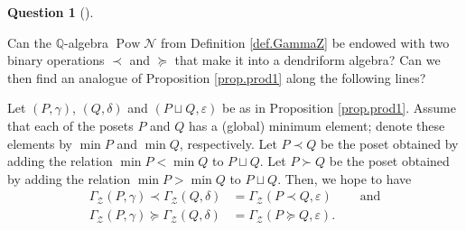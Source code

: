 \documentclass[numbers=enddot,12pt,final,onecolumn,notitlepage]{scrartcl}%
\theoremstyle{definition}
\newtheorem{quest}[theo]{Question}
\newenvironment{question}[1][]
{\begin{quest}[#1]\begin{leftbar}}
{\end{leftbar}\end{quest}}
\newenvironment{question}[1][Question]{\noindent\textbf{#1.} }{\ \rule{0.5em}{0.5em}}
\newenvironment{vershort}{}{}
\begin{document}
\begin{vershort}
\begin{question}
Can the $\mathbb{Q}$-algebra $\operatorname*{Pow}\mathcal{N}$ from Definition
\ref{def.GammaZ} be endowed with two binary operations $\left.  \prec\right.
$ and $\left.  \succeq\right.  $ that make it into a dendriform algebra? Can
we then find an analogue of Proposition \ref{prop.prod1} along the following lines?

Let $\left(  P,\gamma\right)  $, $\left(  Q,\delta\right)  $ and $\left(
P\sqcup Q,\varepsilon\right)  $ be as in Proposition \ref{prop.prod1}. Assume
that each of the posets $P$ and $Q$ has a (global) minimum element; denote these
elements by $\min P$ and $\min Q$, respectively.
Let $P \left. \prec \right. Q$ be the poset obtained by adding
the relation $\min P<\min Q$ to $P\sqcup Q$.
Let $P \left. \succ \right. Q$ be the poset obtained by adding
the relation $\min P>\min Q$ to $P\sqcup Q$.
Then, we hope to have%
\begin{align*}
\Gamma_{\mathcal{Z}}\left(  P,\gamma\right)  \left.  \prec\right.
\Gamma_{\mathcal{Z}}\left(  Q,\delta\right)   &  =\Gamma_{\mathcal{Z}}\left(
P\left.  \prec\right.  Q,\varepsilon\right)  \ \ \ \ \ \ \ \ \ \ \text{and}\\
\Gamma_{\mathcal{Z}}\left(  P,\gamma\right)  \left.  \succeq\right.
\Gamma_{\mathcal{Z}}\left(  Q,\delta\right)   &  =\Gamma_{\mathcal{Z}}\left(
P\left.  \succeq\right.  Q,\varepsilon\right)  .
\end{align*}
\end{question}
\end{vershort}
\end{document}
